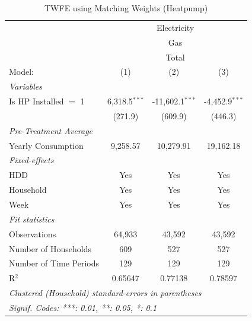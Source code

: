 
\begin{table}[htbp]
   \caption{\label{tab:hp-matching} TWFE using Matching Weights (Heatpump)}
   \centering
   \begin{tabular}{lccc}
      \tabularnewline \midrule \midrule
       & \multicolumn{3}{c}{Electricity} \\ 
       & \multicolumn{3}{c}{Gas} \\ 
       & \multicolumn{3}{c}{Total} \\ 
      Model:                         & (1)             & (2)               & (3)\\  
      \midrule
      \emph{Variables}\\
      Is HP Installed $=$ 1          & 6,318.5$^{***}$ & -11,602.1$^{***}$ & -4,452.9$^{***}$\\   
                                     & (271.9)         & (609.9)           & (446.3)\\   
      \midrule
\emph{Pre-Treatment Average}\\
      Yearly Consumption             & 9,258.57        & 10,279.91         & 19,162.18\\  
\midrule
      \emph{Fixed-effects}\\
      HDD                            & Yes             & Yes               & Yes\\  
      Household                      & Yes             & Yes               & Yes\\  
      Week                           & Yes             & Yes               & Yes\\  
      \midrule
      \emph{Fit statistics}\\
      Observations                   & 64,933          & 43,592            & 43,592\\  
      Number of Households & 609             & 527               & 527\\  
      Number of Time Periods         & 129             & 129               & 129\\  
      R$^2$                          & 0.65647         & 0.77138           & 0.78597\\  
      \midrule \midrule
      \multicolumn{4}{l}{\emph{Clustered (Household) standard-errors in parentheses}}\\
      \multicolumn{4}{l}{\emph{Signif. Codes: ***: 0.01, **: 0.05, *: 0.1}}\\
   \end{tabular}
\end{table}


